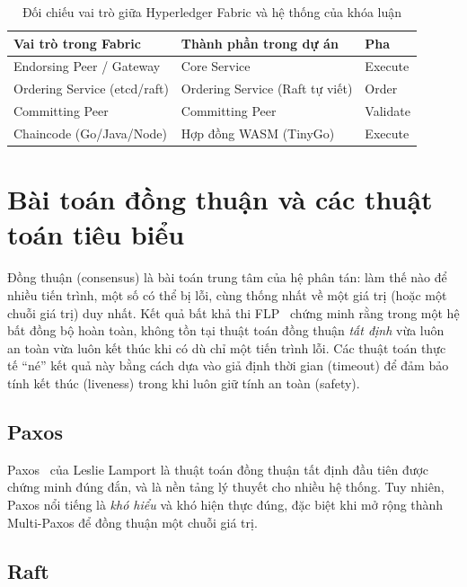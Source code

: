 \begin{table}[H]
\centering
\caption{Đối chiếu vai trò giữa Hyperledger Fabric và hệ thống của khóa luận}
\label{tab:fabric-mapping}
\begin{tabular}{@{}p{4cm}p{4.5cm}p{3.5cm}@{}}
\toprule
\textbf{Vai trò trong Fabric} & \textbf{Thành phần trong dự án} & \textbf{Pha} \\
\midrule
Endorsing Peer / Gateway & Core Service & Execute \\
Ordering Service (etcd/raft) & Ordering Service (Raft tự viết) & Order \\
Committing Peer & Committing Peer & Validate \\
Chaincode (Go/Java/Node) & Hợp đồng WASM (TinyGo) & Execute \\
\bottomrule
\end{tabular}
\end{table}

\section{Bài toán đồng thuận và các thuật toán tiêu biểu}
\label{sec:consensus}

Đồng thuận (consensus) là bài toán trung tâm của hệ phân tán: làm thế nào để
nhiều tiến trình, một số có thể bị lỗi, cùng thống nhất về một giá trị (hoặc một
chuỗi giá trị) duy nhất. Kết quả bất khả thi FLP~\cite{fischer1985flp} chứng minh
rằng trong một hệ bất đồng bộ hoàn toàn, không tồn tại thuật toán đồng thuận
\textit{tất định} vừa luôn an toàn vừa luôn kết thúc khi có dù chỉ một tiến
trình lỗi. Các thuật toán thực tế ``né'' kết quả này bằng cách dựa vào giả định
thời gian (timeout) để đảm bảo tính kết thúc (liveness) trong khi luôn giữ tính
an toàn (safety).

\subsection{Paxos}

Paxos~\cite{lamport1998paxos} của Leslie Lamport là thuật toán đồng thuận tất
định đầu tiên được chứng minh đúng đắn, và là nền tảng lý thuyết cho nhiều hệ
thống. Tuy nhiên, Paxos nổi tiếng là \textit{khó hiểu} và khó hiện thực đúng,
đặc biệt khi mở rộng thành Multi-Paxos để đồng thuận một chuỗi giá trị.

\subsection{Raft}
\label{sec:raft-related}

